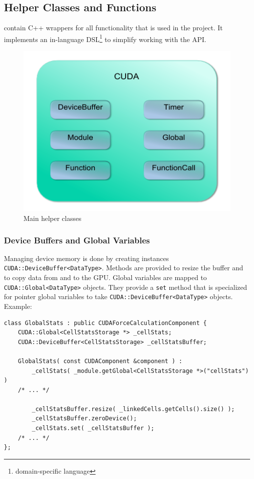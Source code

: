 \subsection{\cuda{} Helper Classes and Functions}
 contain C++ wrappers for all \cuda{} functionality that is used in the project.
It implements an in-language DSL\footnote{domain-specific language} to simplify working with the \cuda{} API.

\begin{figure}
\caption{Main \cuda{} helper classes}
\centering
\includegraphics{figures/helpers_classes.pdf}
\end{figure}

\subsubsection{Device Buffers and Global Variables}
Managing device memory is done by creating instances \lstinline!CUDA::DeviceBuffer<DataType>!. Methods are provided to resize the buffer and to copy data from and to the GPU.
Global variables are mapped to \lstinline!CUDA::Global<DataType>! objects. They provide a \lstinline!set! method that is specialized for pointer global variables to take \lstinline!CUDA::DeviceBuffer<DataType>! objects.
Example:
\begin{lstlisting}[label=cudamemoryhelpers,caption=CUDA helper classes for Device Memory and Globals]
class GlobalStats : public CUDAForceCalculationComponent {
	CUDA::Global<CellStatsStorage *> _cellStats;
	CUDA::DeviceBuffer<CellStatsStorage> _cellStatsBuffer;
	
	GlobalStats( const CUDAComponent &component ) :
		_cellStats( _module.getGlobal<CellStatsStorage *>("cellStats") )
	/* ... */
	
		_cellStatsBuffer.resize( _linkedCells.getCells().size() );
		_cellStatsBuffer.zeroDevice();
		_cellStats.set( _cellStatsBuffer );		
	/* ... */		
};	
\end{lstlisting}

